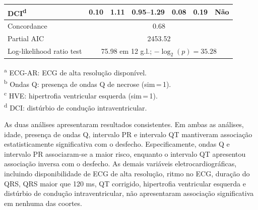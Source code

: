 \begin{table}[htbp]
{\begin{tabular}{lcccccc}
			DCI\textsuperscript{d}     & 0.10                                                     & 1.11 & 0.95--1.29 & 0.08 & 0.19     & N\~ao           \\
			\midrule
			Concordance                & \multicolumn{6}{c}{0.68}                                                                                         \\
			Partial AIC                & \multicolumn{6}{c}{2453.52}                                                                                      \\
			Log-likelihood ratio test  & \multicolumn{6}{c}{75.98 em 12 g.l.; $-\log_2(p)=35.28$}                                                         \\
			\bottomrule
		\end{tabular}%
	}
	\begin{flushleft}
		\footnotesize
		\textsuperscript{a} ECG-AR: ECG de alta resolução disponível.\\
		\textsuperscript{b} Ondas Q: presença de ondas Q de necrose (sim\,=\,1).\\
		\textsuperscript{c} HVE: hipertrofia ventricular esquerda (sim\,=\,1).\\
		\textsuperscript{d} DCI: distúrbio de condução intraventricular.
	\end{flushleft}
\end{table}

\FloatBarrier

As duas análises apresentaram resultados consistentes. Em ambas as análises, idade, presença de ondas Q, intervalo PR e intervalo QT mantiveram associação estatisticamente significativa com o desfecho. Especificamente, ondas Q e intervalo PR associaram-se a maior risco, enquanto o intervalo QT apresentou associação inversa com o desfecho. As demais variáveis eletrocardiográficas, incluindo disponibilidade de ECG de alta resolução, ritmo no ECG, duração do QRS, QRS maior que 120 ms, QT corrigido, hipertrofia ventricular esquerda e distúrbio de condução intraventricular, não apresentaram associação significativa em nenhuma das coortes.




